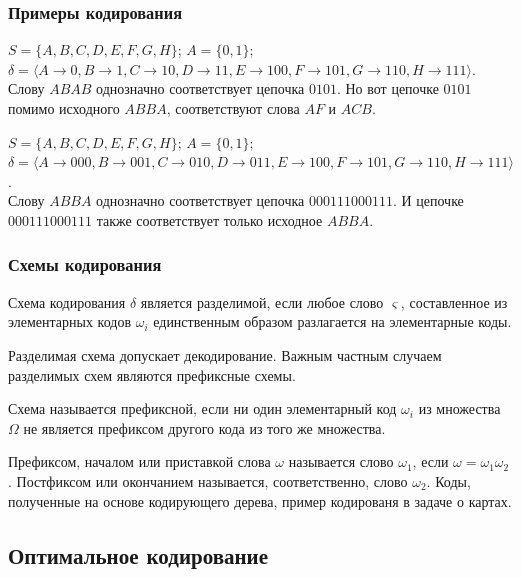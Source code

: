 \begin{frame}
    \frametitle{Примеры кодирования}

    \begin{example}
        $S=\{A,B,C,D,E,F,G,H\}$; $A=\{0,1\}$; $\delta=\langle A\to 0,B\to 1,C\to 10,D\to 11,E\to 100,F\to 101,G\to 110,H\to 111 \rangle$. \\Слову $ABAB$ однозначно соответствует цепочка $0101$. Но вот цепочке $0101$ помимо исходного $ABBA$, соответствуют слова $AF$ и $ACB$.
    \end{example} 

    \begin{example}
        $S=\{A,B,C,D,E,F,G,H\}$; $A=\{0,1\}$; $\delta=\langle A\to 000,B\to 001,C\to 010,D\to 011,E\to 100,F\to 101,G\to 110,H\to 111 \rangle$. \\Слову $ABBA$ однозначно соответствует цепочка $000111000111$. И цепочке $000111000111$ также соответствует только  исходное $ABBA$.
    \end{example} 
\end{frame}


\begin{frame}
\frametitle{Схемы кодирования}

\begin{definition}
    Схема кодирования $\delta$ является \alert{разделимой}, если любое слово $\varsigma$, составленное из элементарных кодов $\omega_i$ единственным образом разлагается на элементарные коды.
\end{definition} 
Разделимая схема допускает декодирование. Важным частным случаем \alert{разделимых} схем являются \alert{префиксные} схемы.
\begin{definition}
    Схема называется \alert{префиксной}, если ни один элементарный код $\omega_i$ из множества $\Omega$ не является префиксом другого кода из того же множества.
\end{definition} 
\end{frame}

Префиксом, началом или приставкой слова $\omega$ называется слово $\omega_1$, если $\omega=\omega_1\omega_2$. Постфиксом или окончанием называется, соответственно, слово $\omega_2$. Коды, полученные на основе кодирующего дерева, пример кодированя в задаче о картах.


\subsection{Оптимальное кодирование}


